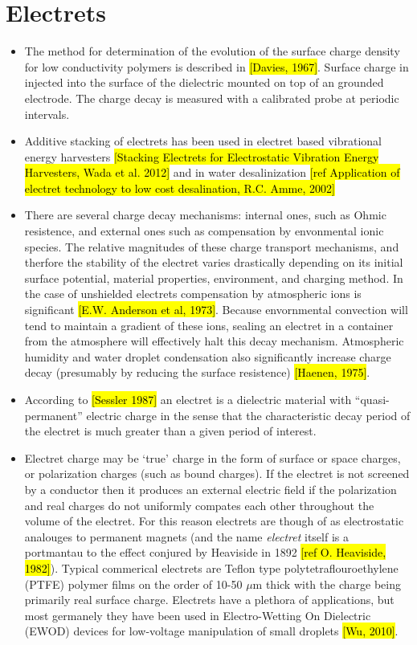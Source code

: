 \documentclass[10pt,a4paper]{article}
\author{Erin Schmidt}
\begin{document}
\doublespacing
\section{Electrets}
\begin{itemize}
\item The method for determination of the evolution of the surface charge density for low conductivity polymers is described in \hl{[Davies, 1967]}. Surface charge in injected into the surface of the dielectric mounted on top of an grounded electrode. The charge decay is measured with a calibrated probe at periodic intervals.
\item Additive stacking of electrets has been used in electret based vibrational energy harvesters \hl{[Stacking Electrets for Electrostatic Vibration Energy Harvesters, Wada et al. 2012]} and in water desalinization \hl{[ref Application of electret technology to low cost desalination, R.C. Amme, 2002]}
\item There are several charge decay mechanisms: internal ones, such as Ohmic resistence, and external ones such as compensation by envonmental ionic species. The relative magnitudes of these charge transport mechanisms, and therfore the stability of the electret varies drastically depending on its initial surface potential, material properties, environment, and charging method. In the case of unshielded electrets compensation by atmospheric ions is significant \hl{[E.W. Anderson et al, 1973]}. Because envornmental convection will tend to  maintain a gradient of these ions, sealing an electret in a container from the atmosphere will effectively halt this decay mechanism. Atmospheric humidity and water droplet condensation also significantly increase charge decay (presumably by reducing the surface resistence) \hl{[Haenen, 1975]}.
\item According to \hl{[Sessler 1987]} an electret is a dielectric material with ``quasi-permanent'' electric charge in the sense that the characteristic decay period of the electret is much greater than a given period of interest.
\item Electret charge may be `true' charge in the form of surface or space charges, or polarization charges (such as bound charges). If the electret is not screened by a conductor then it produces an external electric field if the polarization and real charges do not uniformly compates each other throughout the volume of the electret. For this reason electrets are though of as electrostatic analouges to permanent magnets (and the name \emph{electret} itself is a portmantau to the effect conjured by Heaviside in 1892 \hl{[ref O. Heaviside, 1982]}). Typical commerical electrets are Teflon type polytetraflouroethylene (PTFE) polymer films on the order of 10-50 $\mu$m thick with the charge being primarily real surface charge. Electrets have a plethora of applications, but most germanely they have been used in Electro-Wetting On Dielectric (EWOD) devices for low-voltage manipulation of small droplets \hl{[Wu, 2010]}. 

\end{itemize}
\end{document}
